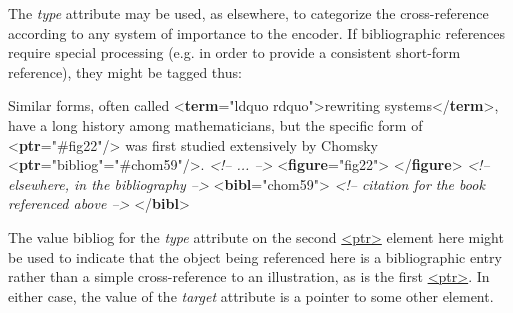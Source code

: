 The {\itshape type} attribute may be used, as elsewhere, to categorize the cross-reference according to any system of importance to the encoder. If bibliographic references require special processing (e.g. in order to provide a consistent short-form reference), they might be tagged thus: \par\bgroup{}\exampleFont \begin{shaded}\noindent\mbox{}Similar forms, often called\mbox{}\newline 
{<\textbf{term}\hspace*{1em}{rend}="{ldquo rdquo}">}rewriting systems{</\textbf{term}>}, have a long history\mbox{}\newline 
 among mathematicians, but the specific form of {<\textbf{ptr}\hspace*{1em}{target}="{\#fig22}"/>}\mbox{}\newline 
 was first studied extensively by Chomsky {<\textbf{ptr}\hspace*{1em}{type}="{bibliog}"\hspace*{1em}{target}="{\#chom59}"/>}.\mbox{}\newline 
\mbox{}\newline 
\textit{<!-- ... -->}\mbox{}\newline 
{<\textbf{figure}\hspace*{1em}{xml:id}="{fig22}">}\mbox{}\newline 
{}\mbox{}\newline 
{</\textbf{figure}>}\mbox{}\newline 
\textit{<!-- elsewhere, in the bibliography -->}\mbox{}\newline 
{<\textbf{bibl}\hspace*{1em}{xml:id}="{chom59}">}\mbox{}\newline 
\textit{<!-- citation for the book referenced above -->}\mbox{}\newline 
{</\textbf{bibl}>}\end{shaded}\egroup\par \noindent  The value bibliog for the {\itshape type} attribute on the second \hyperref[TEI.ptr]{<ptr>} element here might be used to indicate that the object being referenced here is a bibliographic entry rather than a simple cross-reference to an illustration, as is the first \hyperref[TEI.ptr]{<ptr>}. In either case, the value of the {\itshape target} attribute is a pointer to some other element.\par
